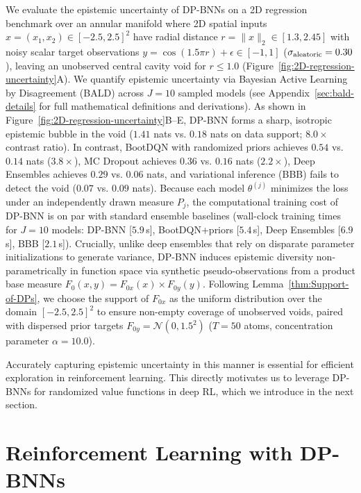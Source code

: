 \documentclass[10pt]{article}
\begin{document}
We evaluate the epistemic uncertainty of DP-BNNs on a 2D regression benchmark over an annular manifold where 2D spatial inputs $x = (x_1, x_2) \in [-2.5, 2.5]^2$ have radial distance $r = \|x\|_2 \in [1.3, 2.45]$ with noisy scalar target observations $y = \cos(1.5\pi r) + \epsilon \in [-1, 1]$ ($\sigma_{\rm aleatoric} = 0.30$), leaving an unobserved central cavity void for $r \le 1.0$ (Figure~\ref{fig:2D-regression-uncertainty}A). We quantify epistemic uncertainty via Bayesian Active Learning by Disagreement (BALD) \citep{houlsby2011bayesian} across $J=10$ sampled models (see Appendix~\ref{sec:bald-details} for full mathematical definitions and derivations). As shown in Figure~\ref{fig:2D-regression-uncertainty}B--E, DP-BNN forms a sharp, isotropic epistemic bubble in the void ($1.41$ nats vs. $0.18$ nats on data support; $8.0\times$ contrast ratio). In contrast, BootDQN with randomized priors achieves $0.54$ vs. $0.14$ nats ($3.8\times$), MC Dropout achieves $0.36$ vs. $0.16$ nats ($2.2\times$), Deep Ensembles achieves $0.29$ vs. $0.06$ nats, and variational inference (BBB) fails to detect the void ($0.07$ vs. $0.09$ nats). Because each model $\theta^{(j)}$ minimizes the loss under an independently drawn measure $P_j$, the computational training cost of DP-BNN is on par with standard ensemble baselines (wall-clock training times for $J=10$ models: DP-BNN [$5.9\,$s], BootDQN+priors [$5.4\,$s], Deep Ensembles [$6.9\,$s], BBB [$2.1\,$s]). Crucially, unlike deep ensembles that rely on disparate parameter initializations to generate variance, DP-BNN induces epistemic diversity non-parametrically in function space via synthetic pseudo-observations from a product base measure $F_0(x, y) = F_{0x}(x) \times F_{0y}(y)$. Following Lemma~\ref{thm:Support-of-DPs}, we choose the support of $F_{0x}$ as the uniform distribution over the domain $[-2.5, 2.5]^2$ to ensure non-empty coverage of unobserved voids, paired with dispersed prior targets $F_{0y} = \mathcal{N}(0, 1.5^2)$ ($T=50$ atoms, concentration parameter $\alpha=10.0$).

Accurately capturing epistemic uncertainty in this manner is essential for efficient exploration in reinforcement learning. This directly motivates us to leverage DP-BNNs for randomized value functions in deep RL, which we introduce in the next section. 


\section{Reinforcement Learning with DP-BNNs}
\label{sec:DP-BNN-randomized-value-functions}
\end{document}
